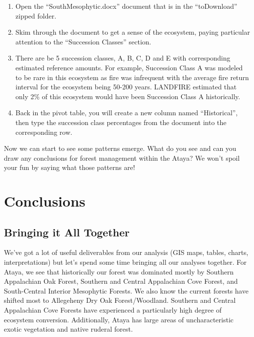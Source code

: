 \documentclass[
]{book}
\providecommand{\tightlist}{%
  \setlength{\itemsep}{0pt}\setlength{\parskip}{0pt}}
\begin{document}
\begin{enumerate}
\def\labelenumi{\arabic{enumi}.}
\tightlist
\item
  Open the ``SouthMesophytic.docx'' document that is in the ``toDownload'' zipped folder.\\
\item
  Skim through the document to get a sense of the ecosystem, paying particular attention to the ``Succession Classes'' section.
\item
  There are be 5 succession classes, A, B, C, D and E with corresponding estimated reference amounts. For example, Succession Class A was modeled to be rare in this ecosystem as fire was infrequent with the average fire return interval for the ecosystem being 50-200 years. LANDFIRE estimated that only 2\% of this ecosystem would have been Succession Class A historically.
\item
  Back in the pivot table, you will create a new column named ``Historical'', then type the succession class percentages from the document into the corresponding row.
\end{enumerate}

Now we can start to see some patterns emerge. What do you see and can you draw any conclusions for forest management within the Ataya? We won't spoil your fun by saying what those patterns are!

\hypertarget{conclusions}{%
\chapter{Conclusions}\label{conclusions}}

\hypertarget{bringing-it-all-together}{%
\section{Bringing it All Together}\label{bringing-it-all-together}}

We've got a lot of useful deliverables from our analysis (GIS maps, tables, charts, interpretations) but let's spend some time bringing all our analyses together. For Ataya, we see that historically our forest was dominated mostly by Southern Appalachian Oak Forest, Southern and Central Appalachian Cove Forest, and South-Central Interior Mesophytic Forests. We also know the current forests have shifted most to Allegeheny Dry Oak Forest/Woodland. Southern and Central Appalachian Cove Forests have experienced a particularly high degree of ecosystem conversion. Additionally, Ataya has large areas of uncharacteristic exotic vegetation and native ruderal forest.
\end{document}

